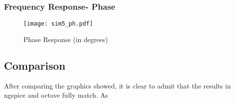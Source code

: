 \subsubsection{Frequency Response- Phase}

\begin{figure}[ht] \centering
\texttt{[image: sim5\_ph.pdf]}
\caption{Phase Response (in degrees)}
\label{fig:sim5_ph}
\end{figure}

\subsection{Comparison}
After comparing the graphics showed, it is clear to admit that the results in ngspice and octave fully match. As 
